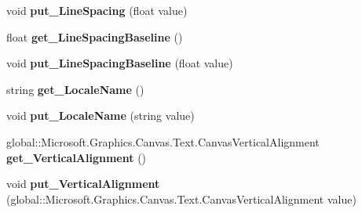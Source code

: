 \begin{DoxyCompactItemize}
void {\bfseries put\+\_\+\+Line\+Spacing} (float value)
\item 
\mbox{\label{interface_microsoft_1_1_graphics_1_1_canvas_1_1_text_1_1_i_canvas_text_format_a9631de3b42e61a4b1a129d768633e3cb}} 
float {\bfseries get\+\_\+\+Line\+Spacing\+Baseline} ()
\item 
\mbox{\label{interface_microsoft_1_1_graphics_1_1_canvas_1_1_text_1_1_i_canvas_text_format_a4e8b8bf13da719b299b6a5676dd92c96}} 
void {\bfseries put\+\_\+\+Line\+Spacing\+Baseline} (float value)
\item 
\mbox{\label{interface_microsoft_1_1_graphics_1_1_canvas_1_1_text_1_1_i_canvas_text_format_a9fbcf60a43f2e17aeac3b52f0ae5e4a2}} 
string {\bfseries get\+\_\+\+Locale\+Name} ()
\item 
\mbox{\label{interface_microsoft_1_1_graphics_1_1_canvas_1_1_text_1_1_i_canvas_text_format_ab29c7707ce1512d0532907fed423fe67}} 
void {\bfseries put\+\_\+\+Locale\+Name} (string value)
\item 
\mbox{\label{interface_microsoft_1_1_graphics_1_1_canvas_1_1_text_1_1_i_canvas_text_format_a46bed4e8bb37c20382588d22721561df}} 
global\+::\+Microsoft.\+Graphics.\+Canvas.\+Text.\+Canvas\+Vertical\+Alignment {\bfseries get\+\_\+\+Vertical\+Alignment} ()
\item 
\mbox{\label{interface_microsoft_1_1_graphics_1_1_canvas_1_1_text_1_1_i_canvas_text_format_a47eeac343ee56e937ea663d034a43e3f}} 
void {\bfseries put\+\_\+\+Vertical\+Alignment} (global\+::\+Microsoft.\+Graphics.\+Canvas.\+Text.\+Canvas\+Vertical\+Alignment value)
\item 
\mbox{\label{interface_microsoft_1_1_graphics_1_1_canvas_1_1_text_1_1_i_canvas_text_format_a8b95906a63861d6e560977db8b154cb6}} 

\end{DoxyCompactItemize}
